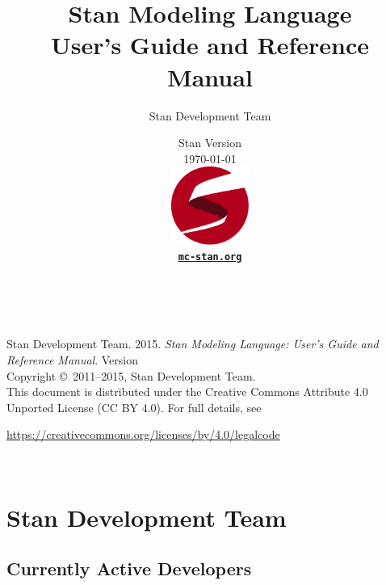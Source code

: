 \title{\Huge\bf Stan Modeling Language \\[4pt] {\LARGE User's Guide
    and Reference Manual}}
\author{Stan Development Team}

\date{\vspace*{36pt} Stan Version \stanversion
\\[8pt] {\small \today}
\\[36pt]
{
\vfill
\includegraphics[width=1in]{img/stanlogo-main.pdf}}
\\
\vspace*{6pt}
{\bfseries \href{http://mc-stan.org/}{\tt mc-stan.org}}
}
\maketitle

\newpage
\thispagestyle{empty}
\mbox{ }
\vfill
\begin{center}
\begin{minipage}[t]{0.75\textwidth}
\small
Stan Development Team. 2015.
{\it Stan Modeling Language: User's Guide and Reference Manual}. Version
\stanversion
\vspace*{20pt}
\mbox{ }
\\
Copyright \copyright \ 2011--2015, Stan Development Team.
\vspace*{28pt}
\mbox{} \\
This document is distributed under the Creative Commons Attribute 4.0
Unported License (CC BY 4.0).  For full details, see
\begin{center}
\url{https://creativecommons.org/licenses/by/4.0/legalcode}
\end{center}
\end{minipage}
\vspace*{24pt}
\mbox{ }
\end{center}

\newpage
\section*{Stan Development Team}

\subsection*{Currently Active Developers}

